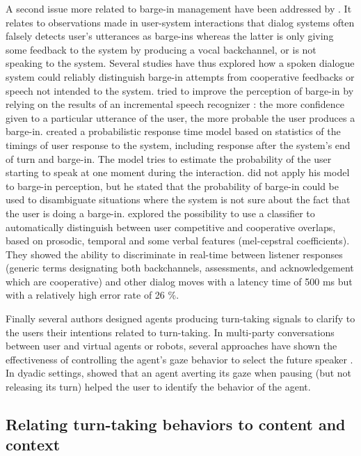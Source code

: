 A second issue more related to barge-in management
have been addressed by \citep{selfridge_continuously_2013}. It relates to observations
made in user-system interactions that dialog systems
often falsely detects user's utterances as barge-ins whereas
the latter is only giving some feedback to the system by
producing a vocal backchannel, or is not speaking to the
system. Several studies have thus explored how a spoken
dialogue system could reliably distinguish barge-in
attempts from cooperative feedbacks or speech not intended
to the system. \citep{selfridge_continuously_2013} tried to improve the perception of barge-in by relying on the results of an incremental speech recognizer : the more confidence given to a particular utterance of the user, the more probable the user produces a barge-in.
\citep{witt_modeling_2014} created a probabilistic response time model based
on statistics of the timings of user response to the system,
including response after the system's end of turn
and barge-in. The model tries to estimate the probability
of the user starting to speak at one moment during
the interaction. \citep{witt_modeling_2014} did not apply his model to barge-in
perception, but he stated that the probability of barge-in
could be used to disambiguate situations where the
system is not sure about the fact that the user is doing a
barge-in. \citep{reidsma_continuous_2011} explored the possibility to use a classifier
to automatically distinguish between user competitive
and cooperative overlaps, based on prosodic, temporal
and some verbal features (mel-cepstral coefficients).
They showed the ability to discriminate in real-time
between listener responses (generic terms designating
both backchannels, assessments, and acknowledgement
which are cooperative) and other dialog moves with a
latency time of 500 ms but with a relatively high error
rate of 26 \%.

Finally several authors designed agents producing turn-taking signals to clarify to the users their intentions related to turn-taking. In multi-party conversations between user and virtual agents or robots, several approaches have shown the effectiveness of controlling the agent's gaze behavior to select the future speaker \citep{mutlu_storytelling_2006,bohus_facilitating_2010,al_moubayed_regulating_2015}. In dyadic settings, \citep{skantze_turn-taking_2014} showed that an agent averting its gaze when pausing (but not releasing its turn) helped the user to identify the behavior of the agent.

\subsection{Relating turn-taking behaviors to content and context}

